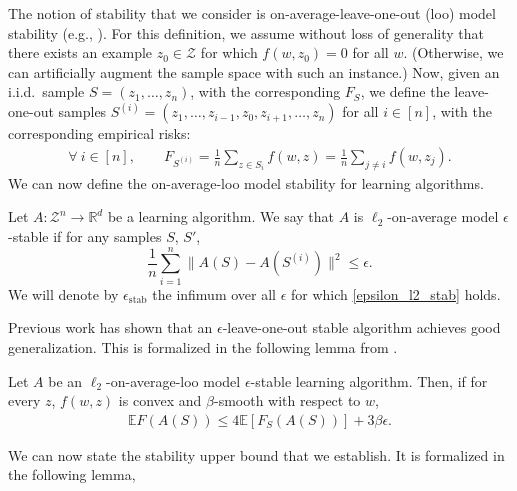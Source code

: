 \documentclass[11pt]{article}
\newcommand{\R}{\mathbb{R}}
\begin{document}
The notion of stability that we consider is on-average-leave-one-out (loo) model stability (e.g., \cite{lei2020fine, schliserman22a}). 
For this definition, we assume without loss of generality that there exists an example $z_0 \in \mathcal{Z}$ for which $f(w,z_0)=0$ for all $w$. (Otherwise, we can artificially augment the sample space with such an instance.)
Now, given an i.i.d.~sample $S = (z_1,\ldots,z_n)$, with the corresponding
$F_S$, we define the leave-one-out samples
$
    S^{(i)} = (z_1,\ldots,z_{i-1},z_0,z_{i+1},\ldots,z_n)
$
for all $i \in [n]$, 
with the corresponding empirical risks:
\begin{align*}
    \forall ~ i \in [n],
    \qquad
    F_{S^{(i)}}
    =
    \frac1n \sum_{z \in S_i} f(w,z)
    =
    \frac1n \sum_{j \neq i} f(w,z_j)
    .
\end{align*}
We can now define the on-average-loo model stability for learning algorithms.\begin{definition} 
Let $A : \mathcal{Z}^n \to \R^d$ be a learning algorithm. We say that $A$ is $\ell_2$-on-average model $\epsilon$-stable if for any
samples $S$, $S'$,
\begin{equation} \label{epsilon_l2_stab}  
    \frac1n \sum_{i=1}^n { \|A(S)-A(S^{(i)})\|^2 }
    \leq 
    \epsilon
    .
\end{equation}
We will denote  by $\epsilon_{\text{stab}}$ the infimum over all $\epsilon$ for which \cref{epsilon_l2_stab} holds.
\end{definition}
Previous work has shown that an $\epsilon$-leave-one-out stable algorithm achieves good generalization. 
This is formalized in the following lemma from \cite{schliserman22a}.

\begin{lemma}
\label{lem:stabtogen}
Let $A$ be an $\ell_2$-on-average-loo model $\epsilon$-stable learning algorithm. Then, if for every $z$, $f(w,z)$ is convex and $\beta$-smooth with respect to $w$, 
\begin{align*}
    \mathbb E { F(A(S)) }
    \leq
    4\mathbb E \left[ F_S (A(S)) \right]
    + 3\beta \epsilon
    .
\end{align*}
\end{lemma}
We can now state the stability upper bound that we establish. 
It is formalized in the following lemma,
\end{document}
